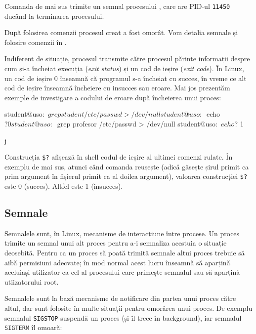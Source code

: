 
Comanda  de mai sus trimite un semnal procesului , care are PID-ul \texttt{11450} ducând la terminarea procesului.

După folosirea comenzii  procesul creat a fost omorât. Vom detalia semnale
și folosire comenzii  în
.

Indiferent de situație, procesul transmite către procesul părinte informații
despre cum și-a încheiat execuția (\textit{exit status}) și un cod de ieșire
(\textit{exit code}). În Linux, un cod de ieșire 0 înseamnă că programul s-a
încheiat cu succes, în vreme ce alt cod de ieșire înseamnă încheiere cu insucces
sau eroare. Mai jos prezentăm exemple de investigare a codului de eroare după
încheierea unui proces:

\begin{screen}
student@uso:~$ grep student /etc/passwd > /dev/null
student@uso:~$ echo $?
0
student@uso:~$ grep profesor /etc/passwd > /dev/null
student@uso:~$ echo $?
1
\end{screen}j

Construcția \texttt{\$?} afișează în shell codul de ieșire al ultimei comenzi rulate. În exemplu de mai sus, atunci când comanda  reușește (adică găsește șirul primit ca prim argument în fișierul primit ca al doilea argument), valoarea construcției \texttt{\$?} este 0 (succes). Altfel este 1 (insucces).

\subsection{Semnale}
\label{sec:procese-operatii-semnale}

Semnalele sunt, în Linux, mecanisme de interacțiune între procese. Un proces
trimite un semnal unui alt proces pentru a-i semnaliza acestuia o situație
deosebită. Pentru ca un proces să poată trimită semnale altui proces trebuie să
aibă permisiuni adecvate; în mod normal acest lucru înseamnă să aparțină
aceluiași utilizator ca cel al procesului care primește semnalul sau să aparțină
utiizatorului root.

Semnalele sunt la bază mecanisme de notificare din partea unui proces către
altul, dar sunt folosite în multe situații pentru omorârea unui proces. De
exemplu semnalul \texttt{SIGSTOP} suspendă un proces (și îl trece în background), iar
semnalul \texttt{SIGTERM} îl omoară:


